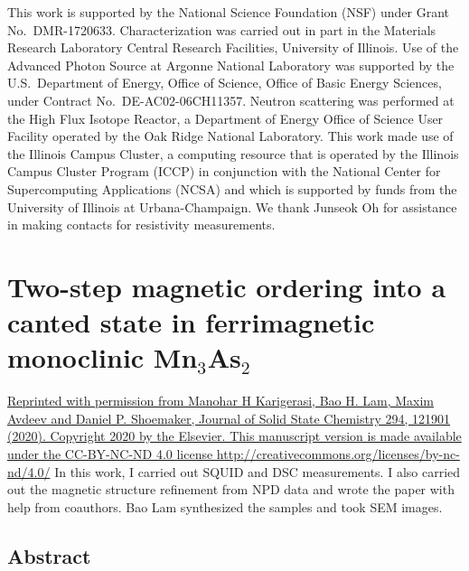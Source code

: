 \documentclass[10pt,doublespacing,edeposit]{uiucthesis2020}
\begin{document}
\begin{mainmatter}
This work is supported by the National Science Foundation (NSF) under Grant No.\ DMR-1720633.
Characterization was carried out in part in the Materials Research Laboratory Central Research Facilities, University of Illinois. Use of the Advanced Photon Source at Argonne National Laboratory was supported by the U.S.\ Department of Energy, Office of Science, Office of Basic Energy Sciences, under Contract No.\ DE-AC02-06CH11357. Neutron scattering was performed at the High Flux Isotope Reactor, a Department of Energy Office of Science User Facility operated by the Oak Ridge National Laboratory.
This work made use of the Illinois Campus Cluster, a computing resource that is operated by the Illinois Campus Cluster Program (ICCP) in conjunction with the National Center for Supercomputing Applications (NCSA) and which is supported by funds from the University of Illinois at Urbana-Champaign.
We thank Junseok Oh for assistance in making contacts for resistivity measurements.

\chapter{Two-step magnetic ordering into a canted state in ferrimagnetic monoclinic Mn$_3$As$_2$}


\hfill \break

\href{https://doi.org/10.1016/j.jssc.2020.121901}{Reprinted with permission from Manohar H Karigerasi, Bao H. Lam, Maxim Avdeev and Daniel P. Shoemaker, Journal of Solid State Chemistry 294, 121901 (2020). Copyright 2020 by the Elsevier. This manuscript version is made available under the CC-BY-NC-ND 4.0 license http://creativecommons.org/licenses/by-nc-nd/4.0/} In this work, I carried out SQUID and DSC measurements. I also carried out the magnetic structure refinement from NPD data and wrote the paper with help from coauthors. Bao Lam synthesized the samples and took SEM images.


\section{Abstract}


\end{mainmatter}
\end{document}
